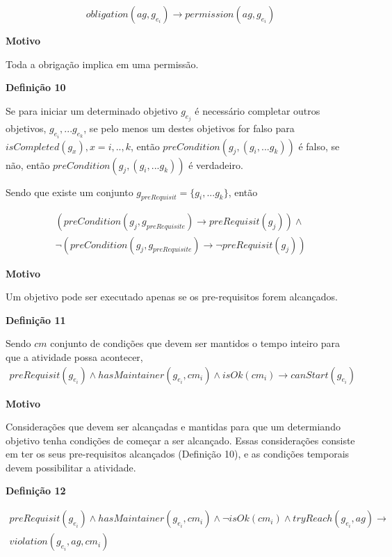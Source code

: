 \documentclass[12pt]{article}
\begin{document}
\begin{equation}
  obligation(ag,g_{e_i}) \to permission(ag,g_{e_i}) 
\end{equation}


\textbf{Motivo} 

Toda a obrigação implica em uma permissão. 


\textbf{Definição 10}

Se para iniciar um determinado objetivo $ g_{e_j} $ é necessário completar outros objetivos, $ g_{e_i}, ... g_{e_k} $, se pelo menos um destes objetivos for falso para $ isCompleted(g_x), x = i,..,k $, então $ preCondition(g_j,(g_{i},...g_{k})) $ é falso, se não, então  $ preCondition(g_j,(g_{i},...g_{k})) $ é verdadeiro.

Sendo que existe um conjunto $ g_{preRequisit} = \{g_{i},...g_{k}\} $, então

\begin{eqnarray}
  (preCondition(g_j,g_{preRequisite}) \to preRequisit(g_j)) \wedge  \\ \neg (preCondition(g_j,g_{preRequisite}) \to \neg preRequisit(g_j))  
\end{eqnarray}

\textbf{Motivo} 

Um objetivo pode ser executado apenas se os pre-requisitos forem alcançados. 


\textbf{Definição 11}

Sendo $cm$ conjunto de condições que devem ser mantidos o tempo inteiro para que a atividade possa acontecer,
\begin{eqnarray}
    preRequisit(g_{e_i}) \wedge hasMaintainer(g_{e_i},cm_i) \wedge isOk(cm_i) \to canStart(g_{e_i}) 
\end{eqnarray}

\textbf{Motivo} 

Considerações que devem ser alcançadas e mantidas para que um determiando objetivo tenha condições de começar a ser alcançado. Essas considerações consiste em ter os seus pre-requisitos alcançados (Definição 10), e as condições temporais devem possibilitar a atividade.  



\textbf{Definição 12} 

\begin{eqnarray}
    preRequisit(g_{e_i}) \wedge hasMaintainer(g_{e_i},cm_i) \wedge \neg isOk(cm_i) \wedge  tryReach(g_{e_i},ag) \to  \\ violation(g_{e_i},ag,cm_i)    
\end{eqnarray}
\end{document}
